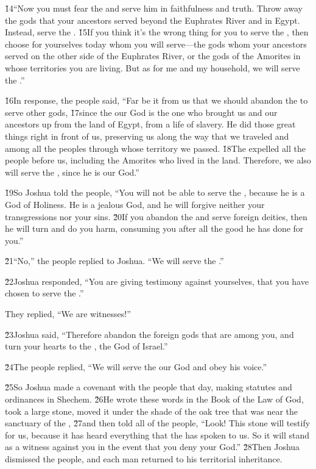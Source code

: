 \v{14}``Now you must fear the  and serve him in faithfulness and truth. Throw away the gods that your ancestors served beyond the Euphrates River and in Egypt. Instead, serve the . \v{15}If you think it's the wrong thing for you to serve the , then choose for yourselves today whom you will serve---the gods whom your ancestors served on the other side of the Euphrates River, or the gods of the Amorites in whose territories you are living. But as for me and my household, we will serve the .''

\v{16}In response, the people said, ``Far be it from us that we should abandon the  to serve other gods, \v{17}since the  our God is the one who brought us and our ancestors up from the land of Egypt, from a life of slavery. He did those great things right in front of us, preserving us along the way that we traveled and among all the peoples through whose territory we passed. \v{18}The  expelled all the people before us, including the Amorites who lived in the land. Therefore, we also will serve the , since he is our God.''

\v{19}So Joshua told the people, ``You will not be able to serve the , because he is a God of Holiness. He is a jealous God, and he will forgive neither your transgressions nor your sins. \v{20}If you abandon the  and serve foreign deities, then he will turn and do you harm, consuming you after all the good he has done for you.''

\v{21}``No,'' the people replied to Joshua. ``We will serve the .''

\v{22}Joshua responded, ``You are giving testimony against yourselves, that you have chosen to serve the .''

They replied, ``We are witnesses!''

\v{23}Joshua said, ``Therefore abandon the foreign gods that are among you, and turn your hearts to the , the God of Israel.''

\v{24}The people replied, ``We will serve the  our God and obey his voice.''

\v{25}So Joshua made a covenant with the people that day, making statutes and ordinances in Shechem. \v{26}He wrote these words in the Book of the Law of God, took a large stone, moved it under the shade of the oak tree that was near the sanctuary of the , \v{27}and then told all of the people, ``Look! This stone will testify for us, because it has heard everything that the  has spoken to us. So it will stand as a witness against you in the event that you deny your God.'' \v{28}Then Joshua dismissed the people, and each man returned to his territorial inheritance.

